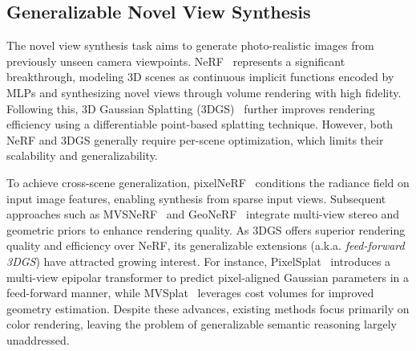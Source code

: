 \documentclass[letterpaper, 10 pt, conference]{ieeeconf}  %
\begin{document}
\subsection{Generalizable Novel View Synthesis}
The novel view synthesis task aims to generate photo-realistic images from previously unseen camera viewpoints.
NeRF~\cite{nerf} represents a significant breakthrough, modeling 3D scenes as continuous implicit functions encoded by MLPs and synthesizing novel views through volume rendering with high fidelity. Following this, 3D Gaussian Splatting (3DGS)~\cite{3dgs} further improves rendering efficiency using a differentiable point-based splatting technique.
However, both NeRF and 3DGS generally require per-scene optimization, which limits their scalability and generalizability.

To achieve cross-scene generalization, pixelNeRF~\cite{pixelnerf} conditions the radiance field on input image features, enabling synthesis from sparse input views. Subsequent approaches such as MVSNeRF~\cite{mvsnerf} and GeoNeRF~\cite{geonerf} integrate multi-view stereo and geometric priors to enhance rendering quality.
As 3DGS offers superior rendering quality and efficiency over NeRF, its generalizable extensions (a.k.a. \textit{feed-forward 3DGS}) have attracted growing interest. For instance, PixelSplat~\cite{pixelsplat} introduces a multi-view epipolar transformer to predict pixel-aligned Gaussian parameters in a feed-forward manner, while MVSplat~\cite{mvsplat} leverages cost volumes for improved geometry estimation.
Despite these advances, existing methods focus primarily on color rendering, leaving the problem of generalizable semantic reasoning largely unaddressed.
\end{document}
